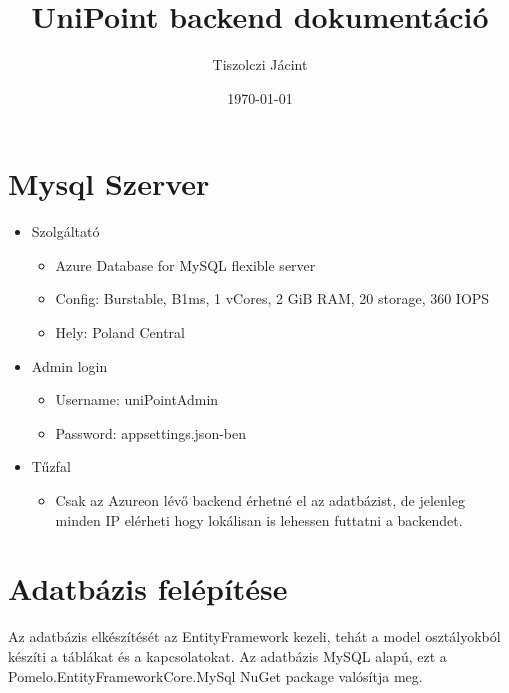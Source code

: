 \documentclass[11pt]{article}
\author{Tiszolczi Jácint}
\date{\today}
\title{UniPoint backend dokumentáció}
\begin{document}
\maketitle
\section{Mysql Szerver}
\label{sec:org4453bc1}
\begin{itemize}
\item Szolgáltató
\begin{itemize}
\item Azure Database for MySQL flexible server
\item Config: Burstable, B1ms, 1 vCores, 2 GiB RAM, 20 storage, 360 IOPS
\item Hely: Poland Central
\end{itemize}
\item Admin login
\begin{itemize}
\item Username: uniPointAdmin
\item Password: appsettings.json-ben
\end{itemize}
\item Tűzfal
\begin{itemize}
\item Csak az Azureon lévő backend érhetné el az adatbázist, de jelenleg minden IP elérheti hogy lokálisan is lehessen futtatni a backendet.
\end{itemize}
\end{itemize}
\section{Adatbázis felépítése}
\label{sec:org9fbeab9}

Az adatbázis elkészítését az EntityFramework kezeli, tehát a model osztályokból készíti a táblákat és a kapcsolatokat. Az adatbázis MySQL alapú, ezt a Pomelo.EntityFrameworkCore.MySql NuGet package valósítja meg.
\end{document}

